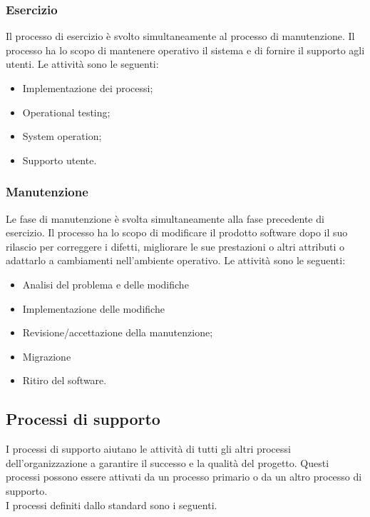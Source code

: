 \subsubsection{Esercizio}
Il processo di esercizio è svolto simultaneamente al processo di manutenzione. Il processo ha lo scopo di mantenere operativo il sistema e di fornire il supporto agli utenti. 
Le attività sono le seguenti:

\begin{itemize}

\item Implementazione dei processi;

\item Operational testing;

\item System operation;

\item Supporto utente.

\end{itemize}

\subsubsection{Manutenzione}
Le fase di manutenzione è svolta  simultaneamente alla fase precedente di esercizio.
Il processo ha lo scopo di modificare il prodotto software dopo il suo rilascio per correggere i difetti, migliorare le sue prestazioni o altri attributi o adattarlo a cambiamenti nell'ambiente operativo.
Le attività sono le seguenti:

\begin{itemize}

\item Analisi del problema e delle modifiche

\item Implementazione delle modifiche

\item Revisione/accettazione della manutenzione;

\item Migrazione

\item Ritiro del software.

\end{itemize}

\subsection{Processi di supporto}
I processi di supporto aiutano le attività di tutti gli altri processi dell'organizzazione a garantire il successo e la qualità del progetto.
Questi processi possono essere attivati da un processo primario o da un altro processo di supporto. \\
I processi definiti dallo standard sono i seguenti.

